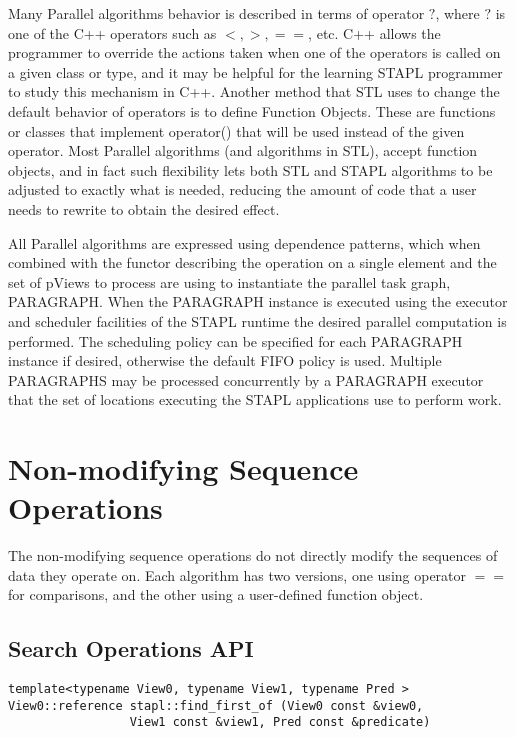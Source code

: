 Many Parallel algorithms behavior is described in terms of operator $?$, where $?$ is one of the C++ operators such as $<, >, ==$, etc. C++ allows the programmer to override the actions taken when one of the operators is called on a given class or type, and it may be helpful for the learning STAPL programmer to study this mechanism in C++. Another method that STL uses to change the default behavior of operators is to define Function Objects. These are functions or classes that implement operator() that will be used instead of the given operator. Most Parallel algorithms (and algorithms in STL), accept function objects, and in fact such flexibility lets both STL and STAPL algorithms to be adjusted to exactly what is needed, reducing the amount of code that a user needs to rewrite to obtain the desired effect.

All Parallel algorithms are expressed using dependence patterns, which when combined with the functor describing the operation on a single element and the set of pViews to process are using to instantiate the parallel task graph, PARAGRAPH. When the PARAGRAPH instance is executed using the executor and scheduler facilities of the STAPL runtime the desired parallel computation is performed. The scheduling policy can be specified for each PARAGRAPH instance if desired, otherwise the default FIFO policy is used. Multiple PARAGRAPHS may be processed concurrently by a PARAGRAPH executor that the set of locations executing the STAPL applications use to perform work.


\pagebreak

\section{Non-modifying Sequence Operations} \label{sec-nonmod-alg}

The non-modifying sequence operations do not directly modify the sequences of data they operate on. Each algorithm has two versions, one using operator $==$ for comparisons, and the other using a user-defined function object.

\subsection{Search Operations API} \label{sec-search-alg}

\begin{verbatim}
template<typename View0, typename View1, typename Pred >
View0::reference stapl::find_first_of (View0 const &view0,
                 View1 const &view1, Pred const &predicate)
\end{verbatim}

